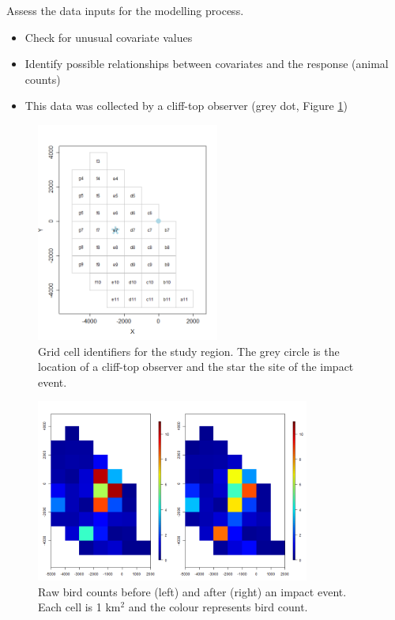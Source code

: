 \begin{frame}[fragile]
Assess the data inputs for the modelling process. 
\begin{itemize}
\item Check for unusual covariate values
\item Identify possible relationships between covariates and the response (animal counts)
\item This data was collected by a cliff-top observer (grey dot, Figure \ref{fig:gridcells})
\end{itemize}


\begin{figure}[h!]
  \centering
  \includegraphics[width=6cm]{bc/vpgridcells.png}
\caption{Grid cell identifiers for the study region.  The grey circle is the location of a cliff-top observer and the star the site of the impact event.}
\label{fig:gridcells}
\end{figure}
\end{frame}

\begin{frame}
\begin{figure}[h!]
\centering
  \includegraphics[width=9cm]{bc/birds.png}
\caption{Raw bird counts before (left) and after (right) an impact event.  Each cell is 1 km$^2$ and the colour represents bird count.}
\label{fig:rawnhats}
\end{figure}
\end{frame}

